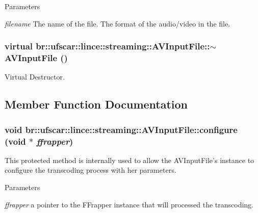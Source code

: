 \begin{DoxyParams}{Parameters}
\item[{\em filename}]The name of the file.  The format of the audio/video in the file. \end{DoxyParams}
\hypertarget{classbr_1_1ufscar_1_1lince_1_1streaming_1_1AVInputFile_a9b28035106da1e3856b5d8c9cba1136a}{
\subsubsection[{$\sim$AVInputFile}]{\setlength{\rightskip}{0pt plus 5cm}virtual br::ufscar::lince::streaming::AVInputFile::$\sim$AVInputFile ()}}
\label{classbr_1_1ufscar_1_1lince_1_1streaming_1_1AVInputFile_a9b28035106da1e3856b5d8c9cba1136a}


Virtual Destructor. 



\subsection{Member Function Documentation}
\hypertarget{classbr_1_1ufscar_1_1lince_1_1streaming_1_1AVInputFile_a66e040fd681aa8bc79d4e86f01f62f5c}{
\subsubsection[{configure}]{\setlength{\rightskip}{0pt plus 5cm}void br::ufscar::lince::streaming::AVInputFile::configure (void $\ast$ {\em ffrapper})}}
\label{classbr_1_1ufscar_1_1lince_1_1streaming_1_1AVInputFile_a66e040fd681aa8bc79d4e86f01f62f5c}


This protected method is internally used to allow the AVInputFile's instance to configure the transcoding process with her parameters. 


\begin{DoxyParams}{Parameters}
\item[{\em ffrapper}]a pointer to the FFrapper instance that will processed the transcoding. \end{DoxyParams}


